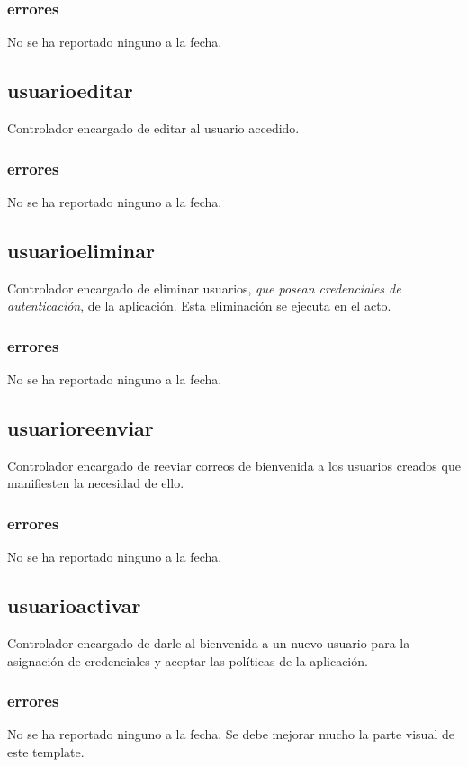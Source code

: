 \documentclass[10pt,a4paper]{book}
\begin{document}
	\subsubsection{errores}
	No se ha reportado ninguno a la fecha.

	\subsection{usuarioeditar}
	Controlador encargado de editar al usuario accedido.
	\subsubsection{errores}
	No se ha reportado ninguno a la fecha.

	\subsection{usuarioeliminar}
	Controlador encargado de eliminar usuarios, \textit{que posean credenciales de autenticación}, de la aplicación. Esta eliminación se ejecuta en el acto.
	\subsubsection{errores}
	No se ha reportado ninguno a la fecha.

	\subsection{usuarioreenviar}
	Controlador encargado de reeviar correos de bienvenida a los usuarios creados que manifiesten la necesidad de ello.
	\subsubsection{errores}
	No se ha reportado ninguno a la fecha.

	\subsection{usuarioactivar}
	Controlador encargado de darle al bienvenida a un nuevo usuario para la asignación de credenciales y aceptar las políticas de la aplicación.
	\subsubsection{errores}
	No se ha reportado ninguno a la fecha. Se debe mejorar mucho la parte visual de este template.
	
\end{document}
